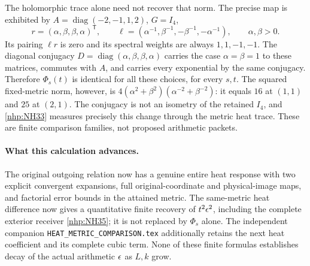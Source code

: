 The holomorphic trace alone need not recover that norm.
The precise map is exhibited by
\(A=\operatorname{diag}(-2,-1,1,2)\), \(G=I_4\),
\[
r=(\alpha,\beta,\beta,\alpha)^{\mathsf T},\qquad
\ell=(\alpha^{-1},\beta^{-1},-\beta^{-1},-\alpha^{-1}),
\qquad \alpha,\beta>0.
\]
Its pairing \(\ell r\) is zero and its spectral weights
are always \(1,1,-1,-1\).
The diagonal conjugacy
\(D=\operatorname{diag}(\alpha,\beta,\beta,\alpha)\)
carries the case \(\alpha=\beta=1\) to these matrices,
commutes with \(A\), and carries every exponential by
the same conjugacy. Therefore \(\Phi_s(t)\) is identical
for all these choices, for every \(s,t\).
The squared fixed-metric norm, however, is
\(4(\alpha^2+\beta^2)(\alpha^{-2}+\beta^{-2})\):
it equals \(16\) at \((1,1)\) and \(25\) at \((2,1)\).
The conjugacy is not an isometry of the retained
\(I_4\), and \eqref{nhp:NH33} measures precisely this
change through the metric heat trace.
These are finite comparison families, not proposed
arithmetic packets.

\paragraph{What this calculation advances.}
The original outgoing relation now has a genuine entire
heat response with two explicit convergent expansions,
full original-coordinate and physical-image maps, and
factorial error bounds in the attained metric.
The same-metric heat difference now gives a quantitative
finite recovery of \(t^2\epsilon^2\), including the complete
exterior receiver \eqref{nhp:NH35}; it is not replaced by
\(\Phi_s\) alone. The independent companion
\texttt{HEAT\_METRIC\_COMPARISON.tex} additionally retains
the next heat coefficient and its complete cubic term.
None of these finite formulas establishes decay of the
actual arithmetic \(\epsilon\) as \(L,k\) grow.

